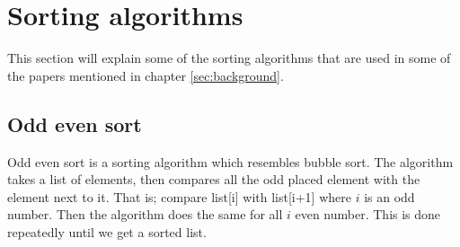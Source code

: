 \chapter{Sorting algorithms}
\label{app:sorting} This section will explain some of the sorting algorithms that are used in some of the papers mentioned in chapter \ref{sec:background}. 
\section{Odd even sort}
Odd even sort is a sorting algorithm which resembles bubble sort. The algorithm takes a list of elements, then compares all the odd placed element with the element next to it. That is; compare list[i] with list[i+1] where $i$ is an odd number. Then the algorithm does the same for all $i$ even number. This is done repeatedly until we get a sorted list.

